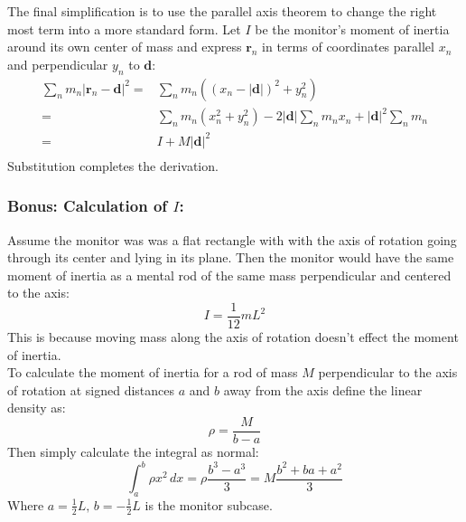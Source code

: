The final simplification is to use the parallel axis theorem to change the right most term into a more standard form.
Let $I$ be the monitor's moment of inertia around its own center of mass and express $\mathbf{r}_n$ in terms of coordinates parallel $x_n$ and perpendicular $y_n$ to $\mathbf{d}$:
\[\begin{aligned}
	\sum_n m_n|\mathbf{\mathbf{r}}_n-\mathbf{d}|^2 =&\sum_nm_n((x_n-|\mathbf{d}|)^2+y_n^2)\\
	=&\sum_nm_n(x_n^2+y_n^2)-2|\mathbf{d}|\sum_nm_nx_n+|\mathbf{d}|^2\sum_nm_n\\
	=&I+M|\mathbf{d}|^2\\
\end{aligned}\]
Substitution completes the derivation.

\subsubsection{Bonus: Calculation of $I$:}
Assume the monitor was was a flat rectangle with with the axis of rotation going through its center and lying in its plane.
Then the monitor would have the same moment of inertia as a mental rod of the same mass perpendicular and centered to the axis:
\[I = \frac{1}{12}mL^2\]
This is because moving mass along the axis of rotation doesn't effect the moment of inertia.
\\

To calculate the moment of inertia for a rod of mass $M$ perpendicular to the axis of rotation at signed distances $a$ and $b$ away from the axis define the linear density as:
\[\rho = \frac{M}{b-a}\]
Then simply calculate the integral as normal:
\[\int_a^b\rho x^2\,dx = \rho\frac{b^3-a^3}{3} = M\frac{b^2+ba+a^2}{3}\]
Where $a=\frac{1}{2}L,\,b=-\frac{1}{2}L$ is the monitor subcase.

